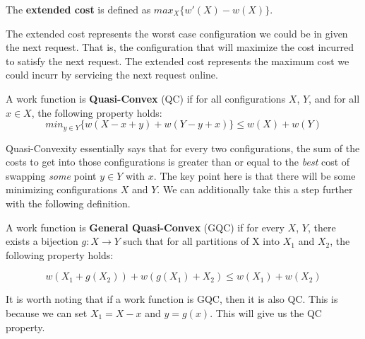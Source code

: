 \begin{definition}
    The \textbf{extended cost} is defined as $max_X \{ w'(X) - w(X)\}$.
\end{definition}

The extended cost represents the worst case configuration we could be in given the next request. That is, the configuration that will maximize the cost incurred to satisfy the next request. The extended cost represents the maximum cost we could incurr by servicing the next request online.

\begin{definition}
    A work function is \textbf{Quasi-Convex} (QC) if for all configurations $X$, $Y$, and for all $x \in X$, the following property holds:
    \begin{equation*}
        min_{y \in Y} \{ w(X - x + y) + w(Y - y + x)\} \leq w(X) + w(Y)
    \end{equation*}
\end{definition}

Quasi-Convexity essentially says that for every two configurations, the sum of the costs to get into those configurations is greater than or equal to the \textit{best} cost of swapping \textit{some} point $y\in Y$ with $x$. The key point here is that there will be some minimizing configurations $X$ and $Y$. We can additionally take this a step further with the following definition.

\begin{definition}
A work function is \textbf{General Quasi-Convex} (GQC) if for every $X$, $Y$, there exists a bijection $g: X \rightarrow Y$ such that for all partitions of X into $X_1$ and $X_2$, the following property holds:

\begin{equation*}
    w(X_1 + g(X_2)) + w(g(X_1) + X_2) \leq w(X_1) + w(X_2)
\end{equation*}
\end{definition}

It is worth noting that if a work function is GQC, then it is also QC. This is because we can set $X_1 = X-x$ and $y = g(x)$. This will give us the QC property.

